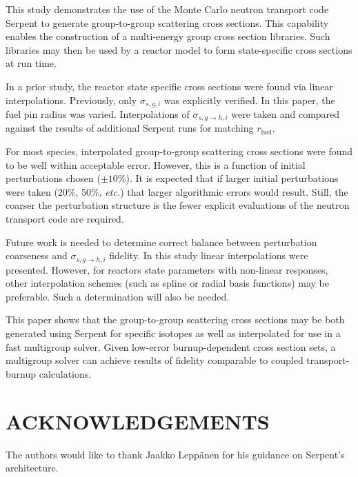 \documentclass{physor2012}
\begin{document}
This study demonstrates the use of the Monte Carlo neutron transport code 
Serpent to generate group-to-group scattering
cross sections.  This capability enables the construction of a multi-energy
group cross section libraries.  Such libraries may then be used by a reactor
model to form state-specific cross sections at run time.

In a prior study, the reactor state specific cross sections were found
via linear interpolations.  Previously, only $\sigma_{s,g,i}$ was
explicitly verified.  In this paper, the fuel pin radius was varied.
Interpolations of $\sigma_{s,g\to h,i}$ were taken and compared against
the results of additional Serpent runs for matching $r_{\mbox{fuel}}$.

For most species, interpolated group-to-group scattering cross sections
were found to be well within acceptable error.  However, this is a function
of initial perturbations chosen ($\pm 10\%$).  It is expected that if larger
initial perturbations were taken (20\%, 50\%, \emph{etc.}) that larger 
algorithmic errors would result.  Still, the coarser the perturbation 
structure is the fewer explicit evaluations of the neutron transport code 
are required.

Future work is needed to determine correct balance between perturbation 
coarseness and $\sigma_{s,g\to h,i}$ fidelity.  In this study linear 
interpolations were presented.  However, for reactors state parameters with 
non-linear responses, other interpolation schemes (such as spline or radial
basis functions) may be preferable.  Such a determination will also be needed.

This paper shows that the group-to-group scattering cross sections may be
both generated using Serpent for specific isotopes as well as interpolated for 
use in a fast multigroup solver.  Given low-error burnup-dependent cross section 
sets, a multigroup solver can achieve results of fidelity comparable to coupled 
transport-burnup calculations.


\section*{ACKNOWLEDGEMENTS}
The authors would like to thank Jaakko Lepp\"{a}nen for his guidance
on Serpent's architecture.

\setlength{\baselineskip}{12pt}


\end{document}
